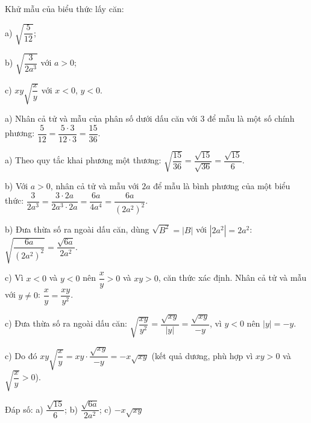 \begin{problem}[9DS-CAN-024]
Khử mẫu của biểu thức lấy căn:

a) $\sqrt{\dfrac{5}{12}}$;

b) $\sqrt{\dfrac{3}{2a^3}}$ với $a > 0$;

c) $xy\sqrt{\dfrac{x}{y}}$ với $x < 0$, $y < 0$.

\begin{solution}
a) Nhân cả tử và mẫu của phân số dưới dấu căn với $3$ để mẫu là một số chính phương: $\dfrac{5}{12} = \dfrac{5 \cdot 3}{12 \cdot 3} = \dfrac{15}{36}$.

a) Theo quy tắc khai phương một thương: $\sqrt{\dfrac{15}{36}} = \dfrac{\sqrt{15}}{\sqrt{36}} = \dfrac{\sqrt{15}}{6}$.

b) Với $a > 0$, nhân cả tử và mẫu với $2a$ để mẫu là bình phương của một biểu thức: $\dfrac{3}{2a^3} = \dfrac{3 \cdot 2a}{2a^3 \cdot 2a} = \dfrac{6a}{4a^4} = \dfrac{6a}{(2a^2)^2}$.

b) Đưa thừa số ra ngoài dấu căn, dùng $\sqrt{B^2} = |B|$ với $|2a^2| = 2a^2$: $\sqrt{\dfrac{6a}{(2a^2)^2}} = \dfrac{\sqrt{6a}}{2a^2}$.

c) Vì $x < 0$ và $y < 0$ nên $\dfrac{x}{y} > 0$ và $xy > 0$, căn thức xác định. Nhân cả tử và mẫu với $y \neq 0$: $\dfrac{x}{y} = \dfrac{xy}{y^2}$.

c) Đưa thừa số ra ngoài dấu căn: $\sqrt{\dfrac{xy}{y^2}} = \dfrac{\sqrt{xy}}{|y|} = \dfrac{\sqrt{xy}}{-y}$, vì $y < 0$ nên $|y| = -y$.

c) Do đó $xy\sqrt{\dfrac{x}{y}} = xy \cdot \dfrac{\sqrt{xy}}{-y} = -x\sqrt{xy}$ (kết quả dương, phù hợp vì $xy > 0$ và $\sqrt{\dfrac{x}{y}} > 0$).

Đáp số: a) $\boxed{\dfrac{\sqrt{15}}{6}}$; b) $\boxed{\dfrac{\sqrt{6a}}{2a^2}}$; c) $\boxed{-x\sqrt{xy}}$
\end{solution}
\end{problem}

